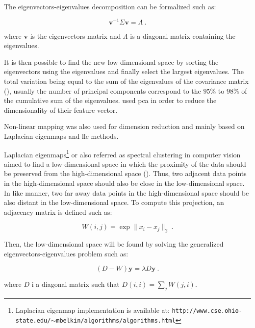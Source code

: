 The eigenvectors-eigenvalues decomposition can be formalized such as:

\begin{equation}
	\mathbf{v}^{-1} \Sigma \mathbf{v} = \Lambda \ .
	\label{eq:eigpca}
\end{equation}

\noindent where $\mathbf{v}$ is the eigenvectors matrix and $\Lambda$ is a diagonal matrix containing the eigenvalues. 

It is then possible to find the new low-dimensional space by sorting the eigenvectors using the eigenvalues and finally select the largest eigenvalues. The total variation being equal to the sum of the eigenvalues of the covariance matrix (\cite{Fodor2002}), usually the number of principal components correspond to the $95\%$ to $98\%$ of the cumulative sum of the eigenvalues. \cite{Tiwari2008,Tiwari2009,Tiwari2012} used \ac{pca} in order to reduce the dimensionality of their feature vector.

Non-linear mapping was also used for dimension reduction and mainly based on Laplacian eigenmaps and \acf{lle} methods.

Laplacian eigenmaps\footnote{Laplacian eigenmap implementation is available at: \texttt{http://www.cse.ohio-state.edu/\allowbreak $\sim$mbelkin/algorithms/algorithms.html}} or also referred as spectral clustering in computer vision aimed to find a low-dimensional space in which the proximity of the data should be preserved from the high-dimensional space (\cite{Shi2000,Belkin2001}). Thus, two adjacent data points in the high-dimensional space should also be close in the low-dimensional space. In like manner, two far away data points in the high-dimensional space should be also distant in the low-dimensional space. To compute this projection, an adjacency matrix is defined such as:

\begin{equation}
	W(i,j) = \exp \| x_i - x_j \|_2 \ .
	\label{eq:gew}
\end{equation}

Then, the low-dimensional space will be found by solving the generalized eigenvectors-eigenvalues problem such as:

\begin{equation}
	(D-W)\mathbf{y} = \lambda D \mathbf{y} \ .
	\label{eq:geeig}
\end{equation}

\noindent where $D$ i a diagonal matrix such that $D(i,i) = \sum_j W(j,i)$.

